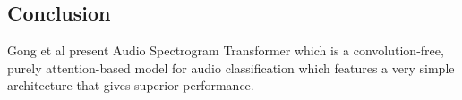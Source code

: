\subsection{Conclusion}
\par Gong et al present Audio Spectrogram Transformer \cite{ast} which is a convolution-free, purely attention-based model for audio classification which features a very simple architecture that gives superior performance.

